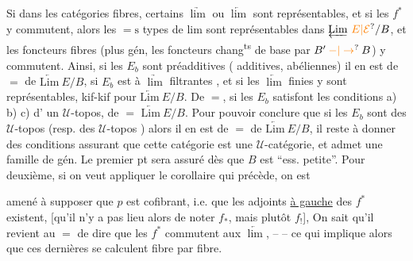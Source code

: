 

Si dans les catégories fibres, certains  $\underrightarrow{\lim}$ ou $\underleftarrow{\lim}$
sont représentables, et si les $f^*$ y commutent,
alors les $=\mathrm{s}$ types de lim sont représentables
dans $\underleftarrow{\mathrm{Lim}}\ \unsure{E|\mathcal E}/B$, et les foncteurs fibres (plus
gén, les foncteurs chang\textsuperscript{ts} de base par 
$B'\mathbin{\unsure{-|\to}}B$) y commutent. Ainsi, si les $E_b$\unsure{/|{}}
sont préadditives ( additives, abéliennes)  il en est
de $=$ de \deleted{$\unsure{\Gamma}$} $\underleftarrow{\mathrm{Lim}}\ E/B$, si $E_b$ est à  $\underrightarrow{\lim}$ filtrantes
, et si les $\underleftarrow{\lim}$ finies y sont représentables,
 kif-kif pour $\underleftarrow{\mathrm{Lim}}\ E/B$. De $=$, si les $E_b$
satisfont  les conditions a) b) c)  d'
un $\mathcal U$-topos,  de $=$ $\underleftarrow{\mathrm{Lim}}\ E/B$. Pour pouvoir
conclure que si les $E_b$ sont des $\mathcal U$-topos
(resp. des $\mathcal U$-topos )  alors il en est de
$=$ de \deleted{$\unsure{\Gamma}$} $\underleftarrow{\mathrm{Lim}}\ E/B$, il reste à donner des
conditions assurant que cette catégorie est une
$\mathcal U$-catégorie, et admet une  famille de gén.
Le premier pt sera assuré dès que $B$ est
``ess. petite''. Pour  deuxième, si on veut
appliquer le corollaire qui précède, on est


amené à supposer que  $p$ est  cofibrant,
i.e. que les adjoints \uline{à gauche} des $f^*$ existent,
[qu'il n'y a pas lieu alors de noter $f_*$, mais
plutôt $f_!$], 
On sait qu'il revient au $=$ de
dire que les $f^*$ commutent aux  $\underleftarrow{\lim}$,
-- -- ce qui implique alors que ces dernières
se calculent fibre par fibre.



